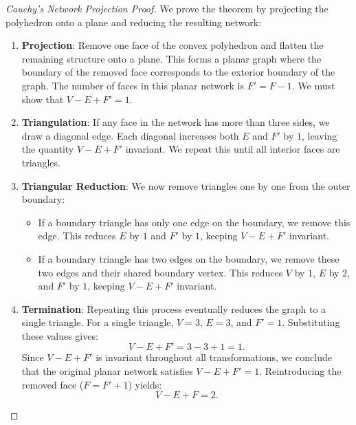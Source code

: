 \documentclass[11pt,a4paper,twoside]{book}
\theoremstyle{eulerstyle}
\theoremstyle{definition}
\begin{document}
\begin{proof}[Cauchy's Network Projection Proof]
We prove the theorem by projecting the polyhedron onto a plane and reducing the resulting network:
\begin{enumerate}
    \item \textbf{Projection}: Remove one face of the convex polyhedron and flatten the remaining structure onto a plane. This forms a planar graph where the boundary of the removed face corresponds to the exterior boundary of the graph. The number of faces in this planar network is $F' = F - 1$. We must show that $V - E + F' = 1$.
    \item \textbf{Triangulation}: If any face in the network has more than three sides, we draw a diagonal edge. Each diagonal increases both $E$ and $F'$ by $1$, leaving the quantity $V - E + F'$ invariant. We repeat this until all interior faces are triangles.
    \item \textbf{Triangular Reduction}: We now remove triangles one by one from the outer boundary:
    \begin{itemize}
        \item If a boundary triangle has only one edge on the boundary, we remove this edge. This reduces $E$ by $1$ and $F'$ by $1$, keeping $V - E + F'$ invariant.
        \item If a boundary triangle has two edges on the boundary, we remove these two edges and their shared boundary vertex. This reduces $V$ by $1$, $E$ by $2$, and $F'$ by $1$, keeping $V - E + F'$ invariant.
    \end{itemize}
    \item \textbf{Termination}: Repeating this process eventually reduces the graph to a single triangle. For a single triangle, $V = 3$, $E = 3$, and $F' = 1$. Substituting these values gives:
    \[
    V - E + F' = 3 - 3 + 1 = 1.
    \]
    Since $V - E + F'$ is invariant throughout all transformations, we conclude that the original planar network satisfies $V - E + F' = 1$. Reintroducing the removed face ($F = F' + 1$) yields:
    \[
    V - E + F = 2.
    \]
\end{enumerate}
\end{proof}
\end{document}
